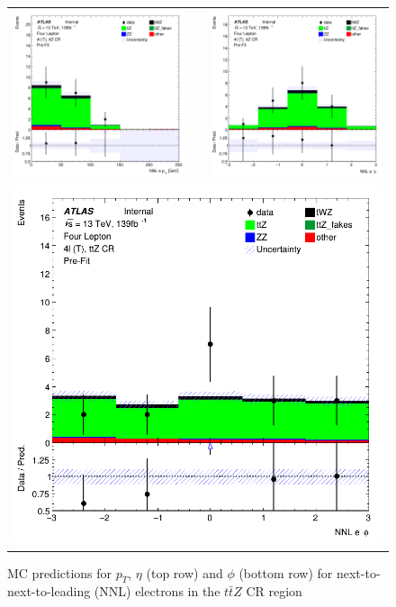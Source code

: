 \begin{figure}[htbp]
\centering
  \begin{tabular}{ccc}

    \includegraphics[width=.2\textwidth]{figures/PreFitPlots/lep4_ttZ_4T_NNL_el_pt} & &
    \includegraphics[width=.2\textwidth]{figures/PreFitPlots/lep4_ttZ_4T_NNL_el_eta} \\
    \multicolumn{3}{c}{\includegraphics[width=.2\textwidth]{figures/PreFitPlots/lep4_ttZ_4T_NNL_el_phi}}
  \end{tabular}
    \caption{MC predictions for $p_{T}$, $\eta$ (top row) and $\phi$ (bottom row) for next-to-next-to-leading (NNL) electrons in the $t\bar{t}Z$ CR region}
  \label{fig:4lep-ttZ-CR-electronPlots}
\end{figure}
\clearpage

